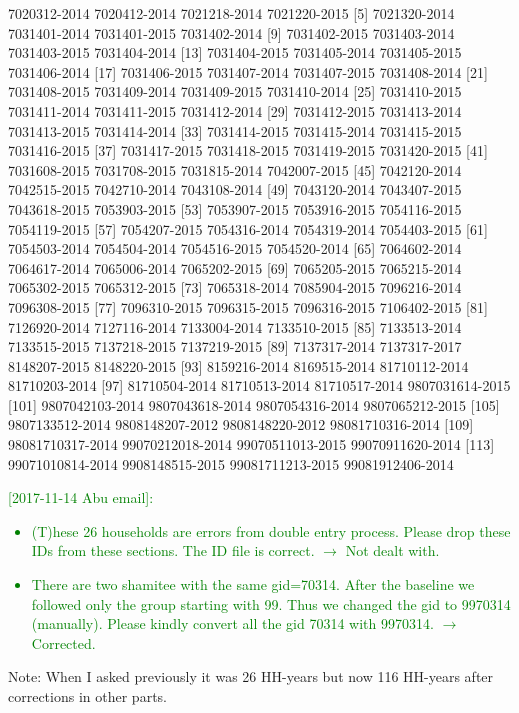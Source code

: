 \begin{Schunk}
\begin{Soutput}
  [1] 7020312-2014     7020412-2014     7021218-2014     7021220-2015    
  [5] 7021320-2014     7031401-2014     7031401-2015     7031402-2014    
  [9] 7031402-2015     7031403-2014     7031403-2015     7031404-2014    
 [13] 7031404-2015     7031405-2014     7031405-2015     7031406-2014    
 [17] 7031406-2015     7031407-2014     7031407-2015     7031408-2014    
 [21] 7031408-2015     7031409-2014     7031409-2015     7031410-2014    
 [25] 7031410-2015     7031411-2014     7031411-2015     7031412-2014    
 [29] 7031412-2015     7031413-2014     7031413-2015     7031414-2014    
 [33] 7031414-2015     7031415-2014     7031415-2015     7031416-2015    
 [37] 7031417-2015     7031418-2015     7031419-2015     7031420-2015    
 [41] 7031608-2015     7031708-2015     7031815-2014     7042007-2015    
 [45] 7042120-2014     7042515-2015     7042710-2014     7043108-2014    
 [49] 7043120-2014     7043407-2015     7043618-2015     7053903-2015    
 [53] 7053907-2015     7053916-2015     7054116-2015     7054119-2015    
 [57] 7054207-2015     7054316-2014     7054319-2014     7054403-2015    
 [61] 7054503-2014     7054504-2014     7054516-2015     7054520-2014    
 [65] 7064602-2014     7064617-2014     7065006-2014     7065202-2015    
 [69] 7065205-2015     7065215-2014     7065302-2015     7065312-2015    
 [73] 7065318-2014     7085904-2015     7096216-2014     7096308-2015    
 [77] 7096310-2015     7096315-2015     7096316-2015     7106402-2015    
 [81] 7126920-2014     7127116-2014     7133004-2014     7133510-2015    
 [85] 7133513-2014     7133515-2015     7137218-2015     7137219-2015    
 [89] 7137317-2014     7137317-2017     8148207-2015     8148220-2015    
 [93] 8159216-2014     8169515-2014     81710112-2014    81710203-2014   
 [97] 81710504-2014    81710513-2014    81710517-2014    9807031614-2015 
[101] 9807042103-2014  9807043618-2014  9807054316-2014  9807065212-2015 
[105] 9807133512-2014  9808148207-2012  9808148220-2012  98081710316-2014
[109] 98081710317-2014 99070212018-2014 99070511013-2015 99070911620-2014
[113] 99071010814-2014 9908148515-2015  99081711213-2015 99081912406-2014
\end{Soutput}
\end{Schunk}
\textcolor{green}{[2017-11-14 Abu email]: 
\begin{itemize}
\vspace{1.0ex}\setlength{\itemsep}{1.0ex}\setlength{\baselineskip}{12pt}
\item	(T)hese 26 households are errors from double entry process. Please drop these IDs from these sections. The ID file is correct. $\rightarrow$ Not dealt with.
\item	There are two shamitee with the same gid=70314. After the baseline we followed only the group starting with 99. Thus we changed the gid to 9970314 (manually). Please kindly convert all the gid 70314 with 9970314. $\rightarrow$ Corrected.
\end{itemize}
} Note: When I asked previously it was 26 HH-years but now 116 HH-years after corrections in other parts.
